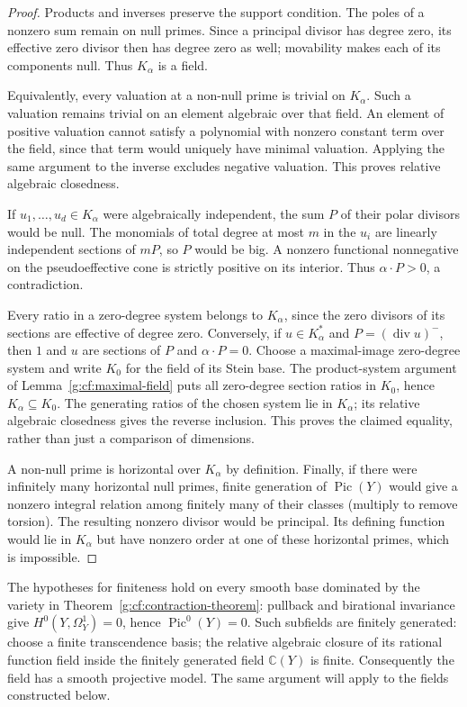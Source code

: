 \begin{proof}
Products and inverses preserve the support condition. The poles of a
nonzero sum remain on null primes. Since a principal divisor has degree
zero, its effective zero divisor then has degree zero as well; movability
makes each of its components null. Thus $K_\alpha$ is a field.

Equivalently, every valuation at a non-null prime is trivial on
$K_\alpha$. Such a valuation remains trivial on an element algebraic over
that field. An element of positive valuation cannot satisfy a polynomial
with nonzero constant term over the field, since that term would uniquely
have minimal valuation. Applying the same argument to the inverse excludes
negative valuation. This proves relative algebraic closedness.

If $u_1,\ldots,u_d\in K_\alpha$ were algebraically independent, the
sum $P$ of their polar divisors would be null. The monomials of total
degree at most $m$ in the $u_i$ are linearly independent sections of
$mP$, so $P$ would be big. A nonzero functional nonnegative on the
pseudoeffective cone is strictly positive on its interior. Thus
$\alpha\cdot P>0$, a contradiction.

Every ratio in a zero-degree system belongs to $K_\alpha$, since the
zero divisors of its sections are effective of degree zero. Conversely,
if $u\in K_\alpha^*$ and $P=(\operatorname{div}u)^-$, then $1$ and
$u$ are sections of $P$ and $\alpha\cdot P=0$. Choose a maximal-image
zero-degree system and write $K_0$ for the field of its Stein base.
The product-system argument of Lemma~\ref{g:cf:maximal-field} puts
all zero-degree section ratios in $K_0$, hence $K_\alpha\subseteq K_0$.
The generating ratios of the chosen system lie in $K_\alpha$; its
relative algebraic closedness gives the reverse inclusion. This proves
the claimed equality, rather than just a comparison of dimensions.

A non-null prime is horizontal over $K_\alpha$ by definition. Finally,
if there were infinitely many horizontal null primes, finite generation
of $\operatorname{Pic}(Y)$ would give a nonzero integral relation among
finitely many of their classes (multiply to remove torsion). The resulting
nonzero divisor would be principal. Its defining function would lie in
$K_\alpha$ but have nonzero order at one of these horizontal primes,
which is impossible.
\end{proof}

The hypotheses for finiteness hold on every smooth base dominated by the
variety in Theorem~\ref{g:cf:contraction-theorem}: pullback and birational
invariance give $H^0(Y,\Omega_Y^1)=0$, hence $\operatorname{Pic}^0(Y)=0$.
Such subfields are finitely generated: choose a finite transcendence basis;
the relative algebraic closure of its rational function field inside the
finitely generated field $\mathbb C(Y)$ is finite. Consequently the field
has a smooth projective model. The same argument will apply to the fields
constructed below.

